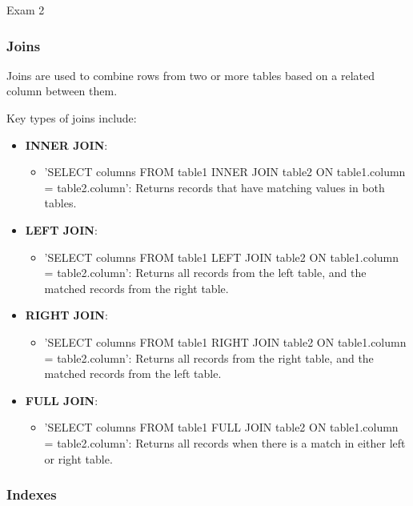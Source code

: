 \begin{examnotes}{Exam 2}
    \subsubsection*{Joins}
    
    Joins are used to combine rows from two or more tables based on a related column between them.
    
    \begin{highlight}[Joins]
        Key types of joins include:
        
        \begin{itemize}
            \item \textbf{INNER JOIN}:
                \begin{itemize}
                    \item 'SELECT columns FROM table1 INNER JOIN table2 ON table1.column = table2.column': Returns records that have matching values in both tables.
                \end{itemize}
            \item \textbf{LEFT JOIN}:
                \begin{itemize}
                    \item 'SELECT columns FROM table1 LEFT JOIN table2 ON table1.column = table2.column': Returns all records from the left table, and the matched records from the right table.
                \end{itemize}
            \item \textbf{RIGHT JOIN}:
                \begin{itemize}
                    \item 'SELECT columns FROM table1 RIGHT JOIN table2 ON table1.column = table2.column': Returns all records from the right table, and the matched records from the left table.
                \end{itemize}
            \item \textbf{FULL JOIN}:
                \begin{itemize}
                    \item 'SELECT columns FROM table1 FULL JOIN table2 ON table1.column = table2.column': Returns all records when there is a match in either left or right table.
                \end{itemize}
        \end{itemize}
    \end{highlight}
    
    \subsubsection*{Indexes}
    

\end{examnotes}
